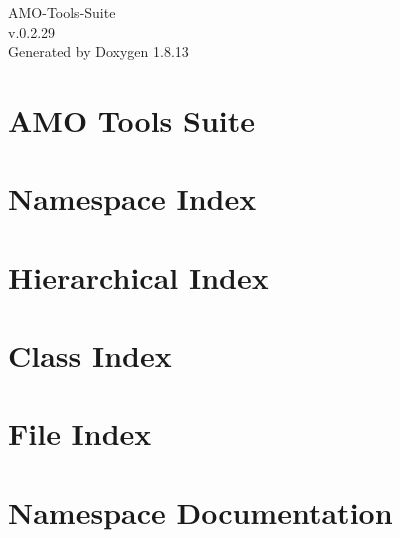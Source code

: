 \documentclass[twoside]{book}
\newcommand{\+}{\discretionary{\mbox{\scriptsize$\hookleftarrow$}}{}{}}
\newcommand{\clearemptydoublepage}{%
  \newpage{\pagestyle{empty}\cleardoublepage}%
}
\begin{document}
\hypersetup{pageanchor=false,
             bookmarksnumbered=true,
             pdfencoding=unicode
            }
\begin{titlepage}
\vspace*{7cm}
\begin{center}%
{\Large A\+M\+O-\/\+Tools-\/\+Suite \\[1ex]\large v.\+0.\+2.\+29 }\\
\vspace*{1cm}
{\large Generated by Doxygen 1.8.13}\\
\end{center}
\end{titlepage}
\clearemptydoublepage
{}
\tableofcontents
\clearemptydoublepage
{}
\hypersetup{pageanchor=true}

\chapter{A\+MO Tools Suite}
\label{index}\hypertarget{index}{}
\chapter{Namespace Index}

\chapter{Hierarchical Index}

\chapter{Class Index}

\chapter{File Index}

\chapter{Namespace Documentation}

\end{document}
